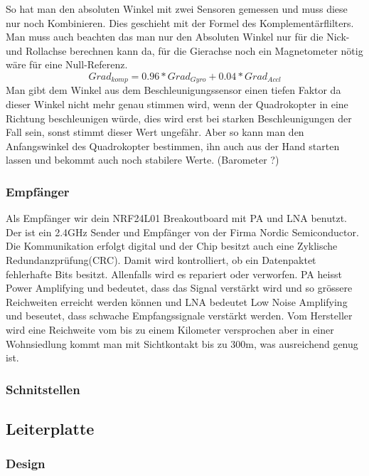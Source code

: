 \documentclass[12pt,a4paper, ngerman]{article}
\begin{document}
So hat man den absoluten Winkel mit zwei Sensoren gemessen und muss diese nur noch Kombinieren. Dies geschieht mit der Formel des Komplementärflilters. Man muss auch beachten das man nur den Absoluten Winkel nur für die Nick-und Rollachse berechnen kann da, für die Gierachse noch ein Magnetometer nötig wäre für eine Null-Referenz.
\begin{equation}
Grad_{komp}=0.96*Grad_{Gyro}+0.04*Grad_{Accl}
\end{equation}
Man gibt dem Winkel aus dem Beschleunigungssensor einen tiefen Faktor da dieser Winkel nicht mehr genau stimmen wird, wenn der Quadrokopter in eine Richtung beschleunigen würde, dies wird erst bei starken Beschleunigungen der Fall sein, sonst stimmt dieser Wert ungefähr. Aber so kann man den Anfangswinkel des Quadrokopter bestimmen, ihn auch aus der Hand starten lassen und bekommt auch noch stabilere Werte. (Barometer ?) 

\subsubsection{Empfänger}
Als Empfänger wir dein NRF24L01 Breakoutboard mit PA und LNA benutzt. Der ist ein 2.4GHz Sender und Empfänger von der Firma Nordic Semiconductor. Die Kommunikation erfolgt digital und der Chip besitzt auch eine Zyklische Redundanzprüfung(CRC). Damit wird kontrolliert, ob ein Datenpaktet fehlerhafte Bits besitzt. Allenfalls wird es repariert oder verworfen. PA heisst Power Amplifying und bedeutet, dass das Signal verstärkt wird und so grössere Reichweiten erreicht werden können und LNA bedeutet Low Noise Amplifying und beseutet, dass schwache Empfangssignale verstärkt werden.\cite{website:electronics.stackexchange.com_WhatisPALNA} Vom Hersteller wird eine Reichweite vom bis zu einem Kilometer versprochen aber in einer Wohnsiedlung kommt man mit Sichtkontakt bis zu 300m, was ausreichend genug ist.

\subsubsection{Schnitstellen}


\subsection{Leiterplatte}

\subsubsection{Design}
\end{document}
